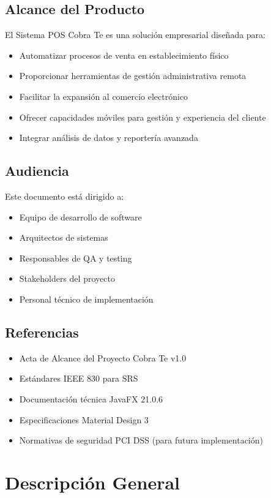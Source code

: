 \documentclass[12pt,letterpaper]{article}
\begin{document}
\subsection{Alcance del Producto}
El Sistema POS Cobra Te es una solución empresarial diseñada para:
\begin{itemize}
    \item Automatizar procesos de venta en establecimiento físico
    \item Proporcionar herramientas de gestión administrativa remota
    \item Facilitar la expansión al comercio electrónico
    \item Ofrecer capacidades móviles para gestión y experiencia del cliente
    \item Integrar análisis de datos y reportería avanzada
\end{itemize}

\subsection{Audiencia}
Este documento está dirigido a:
\begin{itemize}
    \item Equipo de desarrollo de software
    \item Arquitectos de sistemas
    \item Responsables de QA y testing
    \item Stakeholders del proyecto
    \item Personal técnico de implementación
\end{itemize}

\subsection{Referencias}
\begin{itemize}
    \item Acta de Alcance del Proyecto Cobra Te v1.0
    \item Estándares IEEE 830 para SRS
    \item Documentación técnica JavaFX 21.0.6
    \item Especificaciones Material Design 3
    \item Normativas de seguridad PCI DSS (para futura implementación)
\end{itemize}

\section{Descripción General}
\end{document}
